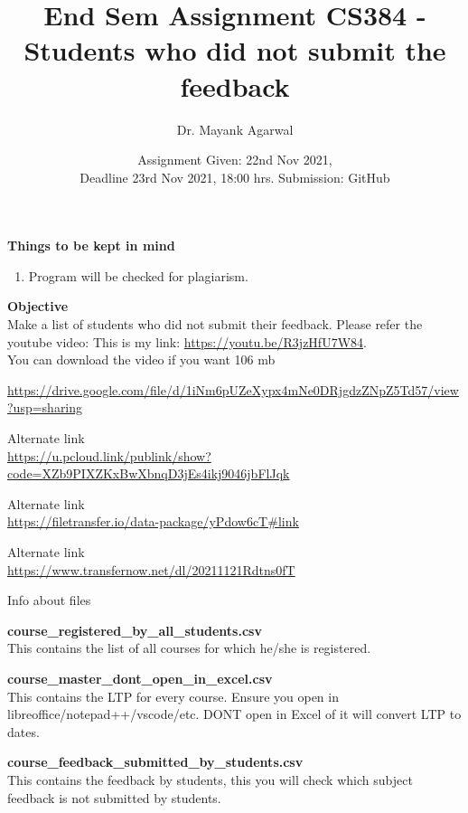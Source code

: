 \documentclass[12pt,  letterpaper,  twoside]{article}
\title{End Sem Assignment CS384 -  Students who did not submit the feedback}
\author{Dr. Mayank Agarwal}
\date{Assignment Given: 22nd Nov 2021,\\ Deadline 23rd Nov 2021,  
	18:00 hrs. Submission: GitHub }
\begin{document}
	\maketitle  
	\textbf{Things to be kept in mind}\\
	\begin{enumerate} 
		\item Program will be checked for plagiarism.   
		
	\end{enumerate}

\textbf{Objective}	\\
Make a list of students who did not submit their feedback. Please refer the youtube video:
This is my link: \href{https://youtu.be/R3jzHfU7W84}{https://youtu.be/R3jzHfU7W84}.\\

You can download the video if you want 106 mb 

\href{https://drive.google.com/file/d/1iNm6pUZeXypx4mNe0DRjgdzZNpZ5Td57/view?usp=sharing}{https://drive.google.com/file/d/1iNm6pUZeXypx4mNe0DRjgdzZNpZ5Td57/view?usp=sharing}

Alternate link \\
\href{https://u.pcloud.link/publink/show?code=XZb9PIXZKxBwXbnqD3jEs4ikj9046jbFlJqk}{https://u.pcloud.link/publink/show?code=XZb9PIXZKxBwXbnqD3jEs4ikj9046jbFlJqk}

Alternate link \\
\href{https://filetransfer.io/data-package/yPdow6cT#link}{https://filetransfer.io/data-package/yPdow6cT\#link}


Alternate link \\
\href{https://www.transfernow.net/dl/20211121Rdtns0fT}{https://www.transfernow.net/dl/20211121Rdtns0fT}

Info about files

\textbf{course\_registered\_by\_all\_students.csv}\\
This contains the list of all courses for which he/she is registered.

\textbf{course\_master\_dont\_open\_in\_excel.csv}\\
This contains the LTP for every course. Ensure you open in libreoffice/notepad++/vscode/etc. DONT open in Excel of it will convert LTP to dates.

\textbf{course\_feedback\_submitted\_by\_students.csv}\\
This contains the feedback by students, this you will check which subject feedback is not submitted by students.
\end{document}
